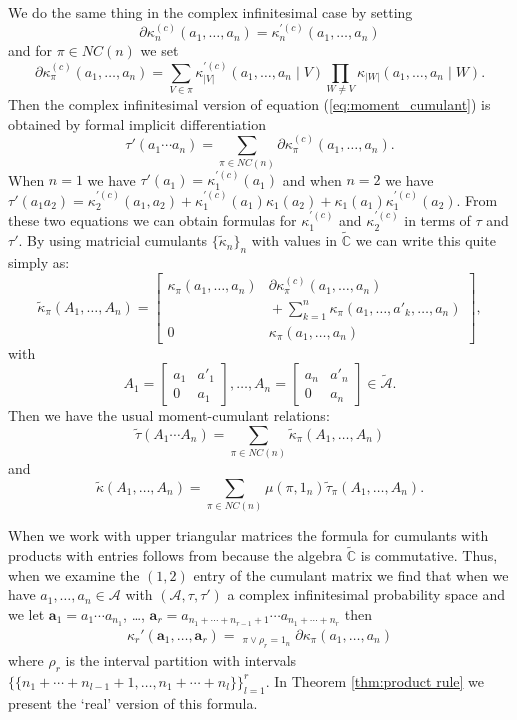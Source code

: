\documentclass[11pt]{amsart}
\theoremstyle{definition}
\numberwithin{theorem}{section}
\newcommand{\tC}{{\widetilde{\mathbb{C}}}}
\newcommand{\cA}{\mathcal{A}}
\newcommand{\tA}{\tilde{\cA}}
\newcommand{\NC}{\mathit{NC}}
\newcommand{\sC}{{{\scriptscriptstyle (c)}}}
\newcommand{\spC}{{{\scriptscriptstyle\prime (c)}}}
\newcommand{\ds}{\displaystyle}
\begin{document}
We do the same thing in the complex infinitesimal case by
setting \[\partial \kappa_n^{\sC}(a_1, \dots, a_n) =
\kappa_n^{{\spC}}(a_1, \dots, a_n)\] and for $\pi \in
\NC(n)$ we set
\[
\partial \kappa_\pi^{\sC} (a_1, \dots, a_n)
=
\sum_{V \in \pi} \kappa_{|V|}^{{\spC}}(a_1, \dots, a_n \mid V)
\prod_{W \not = V} \kappa_{|W|}(a_1, \dots, a_n \mid W). 
\]
Then the complex infinitesimal version of equation
(\ref{eq:moment_cumulant}) is obtained by formal implicit
differentiation
\begin{equation}\label{eq:complex infinitesimal_moment_cumulant}
\tau'(a_1 \cdots a_n)
=
\sum_{\pi \in \NC(n)} \partial \kappa_\pi^{\sC}(a_1, \dots, a_n).
\end{equation}
When $n=1$ we have $\tau'(a_1) = \kappa^{\spC}_1(a_1)$ and
when $n = 2$ we have $\tau'(a_1 a_2) = \kappa^\spC_2(a_1,
a_2) + \kappa^\spC_1(a_1) \kappa_1(a_2) + \kappa_1(a_1)
\kappa^\spC_1(a_2)$. From these two equations we can obtain
formulas for $\kappa^\spC_1$ and $\kappa^\spC_2$ in terms of
$\tau$ and $\tau'$. By using matricial cumulants $\{ \tilde
\kappa_n \}_n$ with values in $\tC$ we can write this quite
simply as:
\[
\tilde\kappa_\pi(A_1, \dots, A_n)
=
\begin{bmatrix} \kappa_\pi(a_1, \dots, a_n ) &
                \partial\kappa^\sC_\pi(a_1, \dots, a_n ) \\
                &  \mbox{} +
                \ds\sum_{k=1}^n \kappa_\pi(a_1, \dots, a'_k, \dots, a_n ) \\
                0 & \kappa_\pi(a_1, \dots, a_n )
\end{bmatrix},                               
\]
with
\[
A_1 = \begin{bmatrix} a_1 & a'_1 \\ 0 & a_1 \end{bmatrix}, \dots, 
A_n = \begin{bmatrix} a_n & a'_n \\ 0 & a_n \end{bmatrix}
\in \tA. 
\]
Then we have the usual moment-cumulant relations:
\[
\tilde\tau(A_1 \cdots A_n) = \sum_{\pi \in \NC(n)} \tilde\kappa_\pi(A_1, \dots, A_n)
\]
and
\[
\tilde\kappa(A_1, \dots, A_n) = \sum_{\pi \in \NC(n)} \mu(\pi, 1_n)\tilde\tau_\pi(A_1, \dots, A_n). 
\]

When we work with upper triangular matrices the formula for
cumulants with products with entries follows from
\cite[Theorem 14.4]{ns} because the algebra $\tC$ is
commutative. Thus, when we examine the $(1, 2)$ entry of the
cumulant matrix we find that when we have $a_1, \dots, a_n
\in \cA$ with $(\cA, \tau, \tau')$ a complex infinitesimal
probability space and we let ${\bm a_1} = a_1 \cdots
a_{n_1}$, \dots, ${\bm a_r} = a_{n_1 + \cdots + n_{r-1} + 1}
\cdots a_{n_1 + \cdots + n_r}$ then
\begin{align}
\label{eq:complex product formula}
\kappa_r'({\bm a_1}, \dots, {\bm a_r})
=
\mathop{\sum_{\pi \in \NC(n)}}_{\pi \vee \rho_r = 1_n}
\partial \kappa_\pi(a_1, \dots, a_n)
\end{align}
where $\rho_r$ is the interval partition with intervals $\{
\{n_1 + \cdots + n_{l-1} + 1, \dots, n_1 + \cdots + n_l\}
\}_{l=1}^r$. In Theorem \ref{thm:product rule} we present
the `real' version of this formula.
\end{document}
